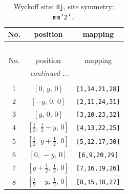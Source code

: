 \documentclass[fleqn,8pt]{jsarticle}
\begin{document}
\begin{longtable}{ccc}
\caption{Wyckoff site: {\tt 8j}, site symmetry: {\tt mm'2'.}}
 \\
 \hline \hline
No. & position & mapping \\ \hline \endfirsthead

\multicolumn{2}{l}{\tablename\ \thetable{}} \\
 \hline \hline
No. & position & mapping \\ \hline \endhead

 \hline \hline
\multicolumn{2}{r}{\footnotesize\it continued ...} \\ \endfoot

 \hline \hline
\multicolumn{2}{r}{} \\ \endlastfoot

1 & $\left[ 0,\, y,\, 0 \right]$ & {\tt [1,14,21,28]} \\ \hline
2 & $\left[ - y,\, 0,\, 0 \right]$ & {\tt [2,11,24,31]} \\ \hline
3 & $\left[ y,\, 0,\, 0 \right]$ & {\tt [3,10,23,32]} \\ \hline
4 & $\left[ \frac{1}{2},\, \frac{1}{2} - y,\, 0 \right]$ & {\tt [4,13,22,25]} \\ \hline
5 & $\left[ \frac{1}{2},\, y + \frac{1}{2},\, 0 \right]$ & {\tt [5,12,17,30]} \\ \hline
6 & $\left[ 0,\, - y,\, 0 \right]$ & {\tt [6,9,20,29]} \\ \hline
7 & $\left[ y + \frac{1}{2},\, \frac{1}{2},\, 0 \right]$ & {\tt [7,16,19,26]} \\ \hline
8 & $\left[ \frac{1}{2} - y,\, \frac{1}{2},\, 0 \right]$ & {\tt [8,15,18,27]} \\
\end{longtable}
\renewcommand{\arraystretch}{1.2}
\end{document}
